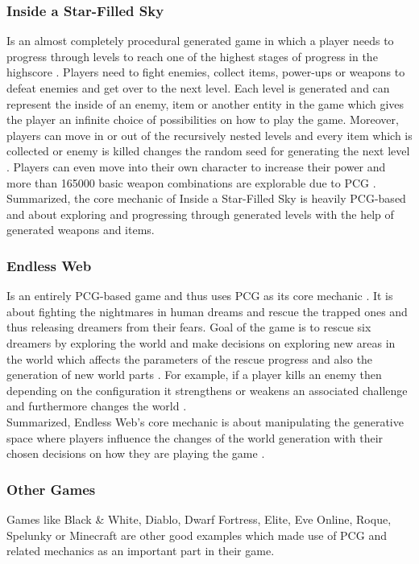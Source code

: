 \documentclass[MGS,Master,english]{twbook}%
\begin{document}
\subsubsection{Inside a Star-Filled Sky}
Is an almost completely procedural generated game in which a player needs to progress through levels to reach one of the highest stages of progress in the highscore \cite{game::insideAStarFilledSky}. Players need to fight enemies, collect items, power-ups or weapons to defeat enemies and get over to the next level. Each level is generated and can represent the inside of an enemy, item or another entity in the game which gives the player an infinite choice of possibilities on how to play the game. Moreover, players can move in or out of the recursively nested levels and every item which is collected or enemy is killed changes the random seed for generating the next level \cite{pcg::endlessWeb}. Players can even move into their own character to increase their power and more than 165000 basic weapon combinations are explorable due to PCG \cite{game::insideAStarFilledSky}.\\
Summarized, the core mechanic of Inside a Star-Filled Sky is heavily PCG-based and about exploring and progressing through generated levels with the help of generated weapons and items.

\subsubsection{Endless Web}
Is an entirely PCG-based game and thus uses PCG as its core mechanic \cite{pcg::endlessWeb}. It is about fighting the nightmares in human dreams and rescue the trapped ones and thus releasing dreamers from their fears. Goal of the game is to rescue six dreamers by exploring the world and make decisions on exploring new areas in the world which affects the parameters of the rescue progress and also the generation of new world parts \cite{pcg::endlessWeb}. For example, if a player kills an enemy then depending on the configuration it strengthens or weakens an associated challenge and furthermore changes the world \cite{pcg::endlessWeb}.\\
Summarized, Endless Web's core mechanic is about manipulating the generative space where players influence the changes of the world generation with their chosen decisions on how they are playing the game \cite{pcg::endlessWeb}.

\subsubsection{Other Games}
Games like Black \& White, Diablo, Dwarf Fortress, Elite, Eve Online, Roque, Spelunky or Minecraft are other good examples which made use of PCG and related mechanics as an important part in their game.
\end{document}
